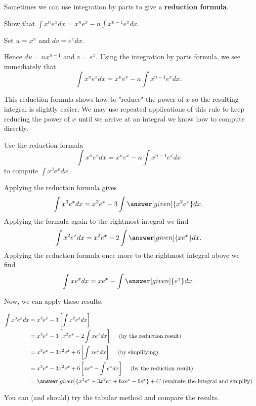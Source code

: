 \documentclass[noauthor]{ximera}
\begin{document}
Sometimes we can use integration by parts to give a \textbf{reduction formula}.

\begin{example}
  Show that $  \int x^n e^x dx = x^n e^x -n \int x^{n-1} e^xdx$.
  \begin{explanation}
   Set $u= x^n$ and $dv = e^x dx$. 
   
   Hence $du = n x^{n-1}$ and $v = e^x$. Using the
    integration by parts formula, we see immediately that
    \[
    \int x^n e^x dx = x^n e^x -n \int x^{n-1} e^x dx.
    \]
  \end{explanation}
\end{example}

This reduction formula shows how to "reduce" the power of $x$ so the resulting integral is slightly easier. We may use repeated applications of this rule to keep reducing the power of $x$ until we arrive at an integral we know how to compute directly. 

\begin{example}
  Use the reduction formula
  \[
  \int x^n e^x dx = x^n e^x -n \int x^{n-1} e^xdx
  \]
  to compute $\int x^3 e^x dx.$
  
  \begin{explanation}
  Applying the reduction formula gives
    \[
    \int x^3 e^x dx = x^3e^x -3\int \answer[given]{x^2 e^x}dx.
    \]
    Applying the formula again to the rightmost integral we find
    \[
    \int x^{2} e^xdx = x^2e^x - 2 \int \answer[given]{x e^x}dx.
    \]
    Applying the reduction formula once more to the rightmost integral above we find
    \[
    \int x e^xdx =xe^x - \int \answer[given]{e^x}dx.
    \]

Now, we can apply these results.

\begin{align*}
        \int x^3 e^x dx& = x^3e^x -3 \left[\int x^2 e^xdx\right] \\
    &= x^3e^x -3 \left[    x^2e^x - 2 \int x e^xdx     \right] \quad \textrm{ (by the reduction result)} \\
    &= x^3e^x - 3x^2e^x+6\left[ \int xe^x dx \right] \quad \textrm{ (by simplifying)} \\
    &= x^3e^x - 3x^2e^x+6\left[ xe^x - \int  e^x dx \right] \quad \textrm{ (by the reduction result)} \\
    & = \answer[given]{x^3e^x - 3x^2e^x+6 xe^x -6e^x} +C \textrm{ (evaluate the integral and simplify)}
\end{align*}

You can (and should) try the tabular method and compare the results.  
  \end{explanation}
\end{example}
\end{document}
